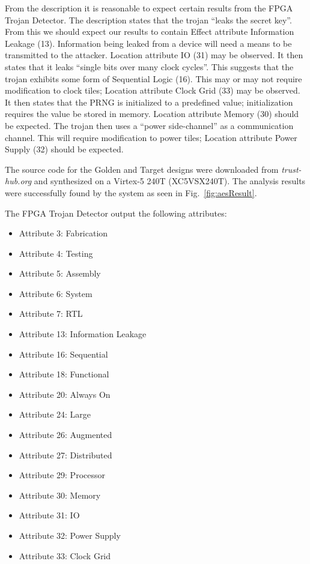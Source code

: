 \documentclass[journal, hidelinks]{IEEEtran}
\begin{document}
From the description it is reasonable to expect certain results from the FPGA Trojan Detector.
The description states that the trojan ``leaks the secret key''.
From this we should expect our results to contain Effect attribute Information Leakage (13).
Information being leaked from a device will need a means to be transmitted to the attacker.
Location attribute IO (31) may be observed.
It then states that it leaks ``single bits over many clock cycles''. 
This suggests that the trojan exhibits some form of Sequential Logic (16).
This may or may not require modification to clock tiles; Location attribute Clock Grid (33) may be observed. 
It then states that the PRNG is initialized to a predefined value; initialization requires the value be stored in memory. 
Location attribute Memory (30) should be expected.
The trojan then uses a ``power side-channel'' as a communication channel.
This will require modification to power tiles; Location attribute Power Supply (32) should be expected.

The source code for the Golden and Target designs were downloaded from \textit{trust-hub.org} and synthesized on a Virtex-5 240T  (XC5VSX240T).
The analysis results were successfully found by the system as seen in Fig.~\ref{fig:aesResult}.

The FPGA Trojan Detector output the following attributes:
\begin{itemize}
	\item Attribute 3: Fabrication
	\item Attribute 4: Testing
	\item Attribute 5: Assembly
	\item Attribute 6: System
	\item Attribute 7: RTL
	\item Attribute 13: Information Leakage
	\item Attribute 16: Sequential
	\item Attribute 18: Functional
	\item Attribute 20: Always On
	\item Attribute 24: Large
	\item Attribute 26: Augmented
	\item Attribute 27: Distributed
	\item Attribute 29: Processor
	\item Attribute 30: Memory
	\item Attribute 31: IO
	\item Attribute 32: Power Supply
	\item Attribute 33: Clock Grid
\end{itemize}
\end{document}

